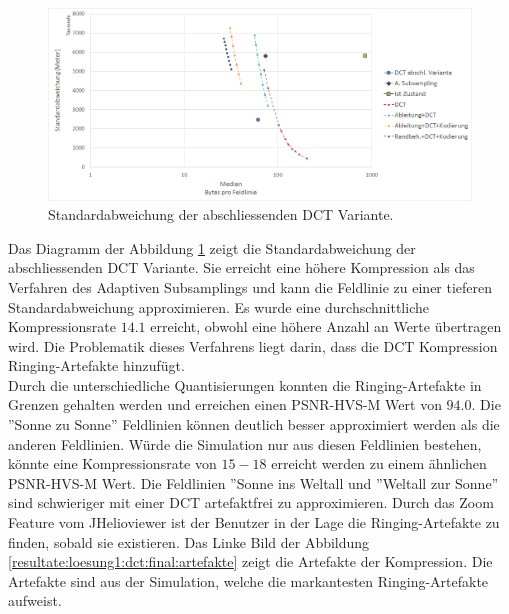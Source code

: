 \begin{figure}[!htbp]
	\center	\includegraphics[width=1\textwidth,keepaspectratio]{./pictures/resultate/loesung1/loesung1-12/resultate.png}
	\caption{Standardabweichung der abschliessenden DCT Variante.}	\label{resultate:loesung1:dct:abschliessend:standardabweichung}
\end{figure} 
Das Diagramm der Abbildung \ref{resultate:loesung1:dct:abschliessend:standardabweichung} zeigt die Standardabweichung der abschliessenden DCT Variante. Sie erreicht eine höhere Kompression als das Verfahren des Adaptiven Subsamplings und kann die Feldlinie zu einer tieferen Standardabweichung approximieren. Es wurde eine durchschnittliche Kompressionsrate $14.1$ erreicht, obwohl eine höhere Anzahl an Werte übertragen wird. Die Problematik dieses Verfahrens liegt darin, dass die DCT Kompression Ringing-Artefakte hinzufügt.\\
Durch die unterschiedliche Quantisierungen konnten die Ringing-Artefakte in Grenzen gehalten werden und erreichen einen PSNR-HVS-M  Wert von $94.0$. Die ''Sonne zu Sonne'' Feldlinien können deutlich besser approximiert werden als die anderen Feldlinien. Würde die Simulation nur aus diesen Feldlinien bestehen, könnte eine Kompressionsrate von $15-18$ erreicht werden zu einem ähnlichen PSNR-HVS-M Wert. Die Feldlinien ''Sonne ins Weltall und ''Weltall zur Sonne'' sind schwieriger mit einer DCT artefaktfrei zu approximieren.  Durch das Zoom Feature vom JHelioviewer ist der Benutzer in der Lage die Ringing-Artefakte zu finden, sobald sie existieren. Das Linke Bild der Abbildung \ref{resultate:loesung1:dct:final:artefakte} zeigt die Artefakte der Kompression. Die Artefakte sind aus der Simulation, welche die markantesten Ringing-Artefakte aufweist.


